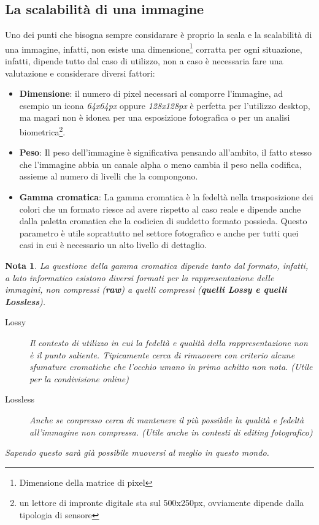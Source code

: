 \documentclass{report}
\newtheorem{nota}{Nota}
\begin{document}
\subsection{La scalabilità di una immagine}
\label{sec:scala}
Uno dei punti che bisogna sempre considarare è proprio la scala e
la scalabilità di una immagine, infatti, non esiste una
dimensione\footnote{Dimensione della matrice di pixel} corratta per ogni
situazione, infatti, dipende tutto dal caso di utilizzo, non a caso è
necessaria fare una valutazione e considerare diversi fattori:
\begin{itemize}
\item \textbf{Dimensione}: il numero di pixel necessari al comporre
  l'immagine, ad esempio un icona \textit{64x64px} oppure
  \textit{128x128px} è perfetta per l'utilizzo desktop, ma magari non è
  idonea per una esposizione fotografica o per un analisi
  biometrica\footnote{un lettore di impronte digitale sta sul
    500x250px, ovviamente dipende dalla tipologia di sensore}.
\item \textbf{Peso}: Il peso dell'immagine è significativa pensando
  all'ambito, il fatto stesso che l'immagine abbia un canale alpha o
  meno cambia il peso nella codifica, assieme al numero di livelli che
  la compongono. 
\item \textbf{Gamma cromatica}: La gamma cromatica è la fedeltà nella
  trasposizione dei colori che un formato riesce ad avere rispetto al
  caso reale e dipende anche dalla paletta cromatica che la codicica di
  suddetto formato possieda. Questo parametro è utile soprattutto nel
  settore fotografico e anche per tutti quei casi in cui è necessario
  un alto livello di dettaglio.
\end{itemize}
\begin{nota}
  La questione della gamma cromatica dipende tanto dal formato, infatti,
  a lato informatico esistono diversi formati per la rappresentazione
  delle immagini, non compressi (\textbf{\color{red}raw}) a quelli
  compressi (\textbf{\color{blue}quelli Lossy e quelli Lossless}).
  \begin{description}
  \item[Lossy] Il contesto di utilizzo in cui la fedeltà e qualità della
    rappresentazione non è il punto saliente. Tipicamente cerca di
    rimuovere con criterio alcune sfumature cromatiche che l'occhio umano
    in primo achitto non nota. (Utile per la condivisione online)
  \item[Lossless] Anche se conpresso cerca di mantenere il più possibile
    la qualità e fedeltà all'immagine non compressa. (Utile anche in
    contesti di editing fotografico)
  \end{description}
  Sapendo questo sarà già possibile muoversi al meglio in questo mondo.
\end{nota}
\end{document}
